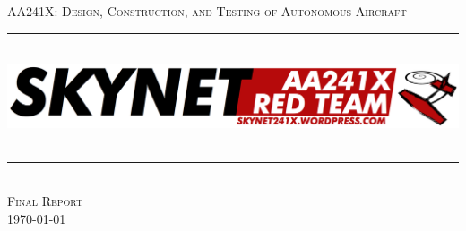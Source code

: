 \documentclass[11pt]{article}
\newcommand{\HRule}{\rule{\linewidth}{0.5mm}}
\begin{document}
\begin{titlepage}
\begin{center}

\textsc{\LARGE AA241X: Design, Construction, and Testing of Autonomous Aircraft}\\
\HRule \\[0.4cm]
\includegraphics[width=1.0\textwidth]{./skynet}~\\
\HRule \\[0.4cm]
\textsc{\Large Final Report}\\
{\large \today}
\vfill


\end{center}
\end{titlepage}
\end{document}
